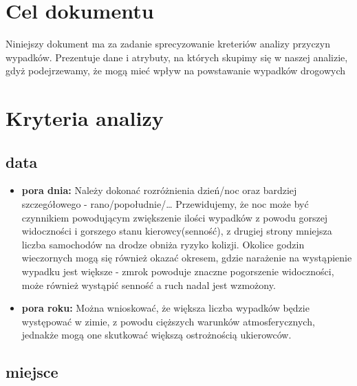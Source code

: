 \section{Cel dokumentu}\label{cel-dokumentu}

Niniejszy dokument ma za zadanie sprecyzowanie kreteriów analizy
przyczyn wypadków. Prezentuje dane i atrybuty, na których skupimy się w
naszej analizie, gdyż podejrzewamy, że mogą mieć wpływ na powstawanie
wypadków drogowych

\section{Kryteria analizy}\label{kryteria-analizy}

\subsection{data}\label{data}

\begin{itemize}
\itemsep1pt\parskip0pt
\item
  \textbf{pora dnia:} Należy dokonać rozróżnienia dzień/noc oraz
  bardziej szczegółowego - rano/popołudnie/\ldots{} Przewidujemy, że noc
  może być czynnikiem powodującym zwiększenie ilości wypadków z powodu
  gorszej widoczności i gorszego stanu kierowcy(senność), z drugiej
  strony mniejsza liczba samochodów na drodze obniża ryzyko kolizji.
  Okolice godzin wieczornych mogą się również okazać okresem, gdzie
  narażenie na wystąpienie wypadku jest większe - zmrok powoduje znaczne
  pogorszenie widoczności, może również wystąpić senność a ruch nadal
  jest wzmożony.\\
\item
  \textbf{pora roku:} Można wnioskować, że większa liczba wypadków
  będzie występować w zimie, z powodu cięższych warunków
  atmosferycznych, jednakże mogą one skutkować większą ostrożnością
  ukierowców.
\end{itemize}

\subsection{miejsce}\label{miejsce}

